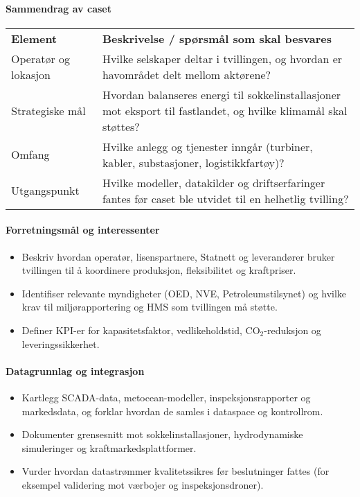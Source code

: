 \paragraph{Sammendrag av caset}
\begin{tabular}{p{}p{}}
\textbf{Element} & \textbf{Beskrivelse / spørsmål som skal besvares} \\
Operatør og lokasjon & Hvilke selskaper deltar i tvillingen, og hvordan er havområdet delt mellom aktørene? \\
Strategiske mål & Hvordan balanseres energi til sokkelinstallasjoner mot eksport til fastlandet, og hvilke klimamål skal støttes? \\
Omfang & Hvilke anlegg og tjenester inngår (turbiner, kabler, substasjoner, logistikkfartøy)? \\
Utgangspunkt & Hvilke modeller, datakilder og driftserfaringer fantes før caset ble utvidet til en helhetlig tvilling? \\
\end{tabular}

\paragraph{Forretningsmål og interessenter}
\begin{itemize}
    \item Beskriv hvordan operatør, lisenspartnere, Statnett og leverandører bruker tvillingen til å koordinere produksjon, fleksibilitet og kraftpriser.\citep{nve2023havvindfakta}
    \item Identifiser relevante myndigheter (OED, NVE, Petroleumstilsynet) og hvilke krav til miljørapportering og HMS som tvillingen må støtte.
    \item Definer KPI-er for kapasitetsfaktor, vedlikeholdstid, CO$_2$-reduksjon og leveringssikkerhet.
\end{itemize}

\paragraph{Datagrunnlag og integrasjon}
\begin{itemize}
    \item Kartlegg SCADA-data, metocean-modeller, inspeksjonsrapporter og markedsdata, og forklar hvordan de samles i dataspace og kontrollrom.\citep{gaiax2023architecture}
    \item Dokumenter grensesnitt mot sokkelinstallasjoner, hydrodynamiske simuleringer og kraftmarkedsplattformer.
    \item Vurder hvordan datastrømmer kvalitetssikres før beslutninger fattes (for eksempel validering mot værbojer og inspeksjonsdroner).
\end{itemize}

